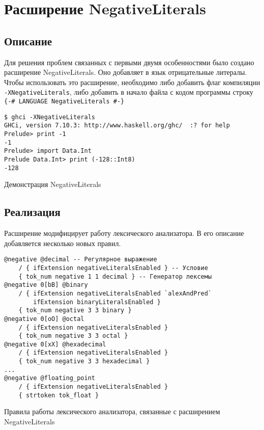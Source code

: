 \section{Расширение NegativeLiterals}

\subsection{Описание}

Для решения проблем связанных с первыми двумя особенностями было создано
расширение NegativeLiterals. Оно добавляет в язык отрицательные литералы.
Чтобы использовать это расширение, необходимо либо добавить флаг компиляции
\texttt{-XNegativeLiterals}, либо добавить в начало файла с кодом программы
строку\\
\texttt{\{-\#\ LANGUAGE\ NegativeLiterals\ \#-\}}

\begin{ListingEnv}[H]
\begin{lstlisting}
$ ghci -XNegativeLiterals
GHCi, version 7.10.3: http://www.haskell.org/ghc/  :? for help
Prelude> print -1
-1
Prelude> import Data.Int
Prelude Data.Int> print (-128::Int8)
-128
\end{lstlisting}
\caption{Демонстрация NegativeLiterals}
\end{ListingEnv}

\subsection{Реализация}

Расширение модифицирует работу лексического анализатора. В его описание
добавляется несколько новых правил.

\begin{ListingEnv}[H]
\begin{verbatim}
@negative @decimal -- Регулярное выражение
    / { ifExtension negativeLiteralsEnabled } -- Условие
    { tok_num negative 1 1 decimal } -- Генератор лексемы
@negative 0[bB] @binary
    / { ifExtension negativeLiteralsEnabled `alexAndPred`
        ifExtension binaryLiteralsEnabled }
    { tok_num negative 3 3 binary }
@negative 0[oO] @octal
    / { ifExtension negativeLiteralsEnabled }
    { tok_num negative 3 3 octal }
@negative 0[xX] @hexadecimal
    / { ifExtension negativeLiteralsEnabled }
    { tok_num negative 3 3 hexadecimal }
...
@negative @floating_point
    / { ifExtension negativeLiteralsEnabled }
    { strtoken tok_float }
\end{verbatim}
\caption{Правила работы лексического анализатора, связанные с расширением
NegativeLiterals}
\label{lst:rules}
\end{ListingEnv}

